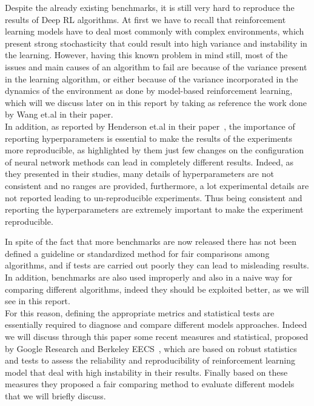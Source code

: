 \documentclass{article}
\begin{document}
Despite the already existing benchmarks, it is still very hard to reproduce the results of Deep RL algorithms. At first we have to recall that reinforcement learning models have to deal most commonly with complex environments, which present strong stochasticity that could result into high variance and instability in the learning. However, having this known problem in mind still, most of the issues and main causes of an algorithm to fail are because of the variance present in the learning algorithm, or either because of the variance incorporated in the dynamics of the environment as done by model-based reinforcement learning, which will we discuss later on in this report by taking as reference the work done by Wang et.al in their paper\cite{MBRLBenchmarking}.\\
In addition, as reported by Henderson et.al in their paper~\cite{DRL01}, the importance of reporting hyperparameters is essential to make the results of the experiments more reproducible, as highlighted by them just few changes on the configuration of neural network methods can lead in completely different results. Indeed, as they presented in their studies, many details of hyperparameters are not consistent and no ranges are provided, furthermore, a lot experimental details are not reported leading to un-reproducible experiments. Thus being consistent and reporting the hyperparameters are extremely important to make the experiment reproducible.

In spite of the fact that more benchmarks are now released there has not been defined a guideline or standardized method for fair comparisons among algorithms, and if tests are carried out poorly they can lead to misleading results. In addition, benchmarks are also used improperly and also in a naive way for comparing different algorithms, indeed they should be exploited better, as we will see in this report.\\
For this reason, defining the appropriate metrics and statistical tests are essentially required to diagnose and compare different models approaches.
Indeed we will discuss through this paper some recent measures and statistical, proposed by Google Research and Berkeley EECS~\cite{GoogleMeasure}, which are based on robust statistics and tests to assess the reliability and reproducibility of reinforcement learning model that deal with high instability in their results. Finally based on these measures they proposed a fair comparing method to evaluate different models that we will briefly discuss.
\end{document}
